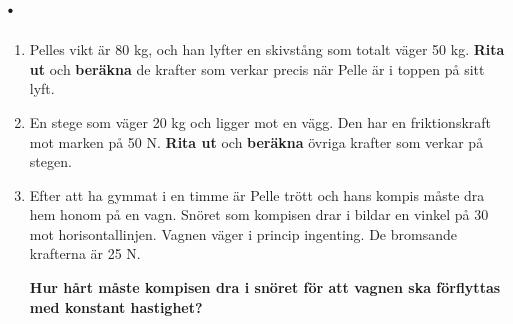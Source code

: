 \documentclass[11pt]{article}
\begin{document}
\section*{\lessonNumber. \lessonName}

\begin{enumerate}[itemsep=2em]
        \item
              \begin{minipage}[t]{0.6\textwidth}
                      Pelles vikt är 80 kg, och han lyfter en skivstång som totalt väger 50 kg. \textbf{Rita ut} och \textbf{beräkna} de krafter som verkar precis när Pelle är i toppen på sitt lyft.
              \end{minipage}
              \hspace{2em}
              \begin{adjustbox}{valign=t}
                      
              \end{adjustbox}
        \item
              \begin{minipage}[t]{0.6\textwidth}
                      En stege som väger 20 kg och ligger mot en vägg. Den har en friktionskraft mot marken på 50 N. \textbf{Rita ut} och \textbf{beräkna} övriga krafter som verkar på stegen.
              \end{minipage}
              \hspace{2em}
              \begin{adjustbox}{valign=t}
                      
              \end{adjustbox}
        \item
              \raggedright
              \setlength{\parskip}{1em}
              Efter att ha gymmat i en timme är Pelle trött och hans kompis måste dra hem honom på en vagn. Snöret som kompisen drar i bildar en vinkel på 30\degree{} mot horisontallinjen. Vagnen väger i princip ingenting. De bromsande krafterna är 25 N.

              \textbf{Hur hårt måste kompisen dra i snöret för att vagnen ska förflyttas med konstant hastighet?}

              \begin{center}
                      
              \end{center}
\end{enumerate}

\newpage
\end{document}
